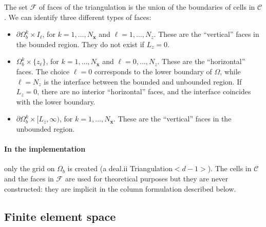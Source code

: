 \documentclass[11pt]{article}
\newcommand{\bx}{\mathbf{x}}
\begin{document}
	The set $\mathcal{F}$ of faces of the triangulation is the union of the boundaries of cells in $\mathcal{C}$. We can identify three different types of faces:
	\begin{itemize}
		\item $\partial\Omega_b^k\times I_\ell$, for $k=1,\dots,N_\bx$ and $\ell=1,\dots,N_z$. These are the ``vertical'' faces in the bounded region. They do not exist if $L_z=0$.
		\item $\Omega_b^k\times\{z_\ell\}$, for $k=1,\dots,N_\bx$ and $\ell=0,\dots,N_z$. These are the ``horizontal'' faces. The choice $\ell=0$ corresponds to the lower boundary of $\Omega$, while $\ell=N_z$ is the interface between the bounded and unbounded region. If $L_z=0$, there are no interior ``horizontal'' faces, and the interface coincides with the lower boundary.
		\item $\partial\Omega_b^k\times[L_z,\infty)$, for $k=1,\dots,N_\bx$. These are the ``vertical'' faces in the unbounded region.
	\end{itemize}
	
	\paragraph{In the implementation} only the grid on $\Omega_b$ is created (a deal.ii Triangulation$<d-1>$). The cells in $\mathcal{C}$ and the faces in $\mathcal{F}$ are used for theoretical purposes but they are never constructed: they are implicit in the column formulation described below.
	
	
	\subsection*{Finite element space}
	
\end{document}

